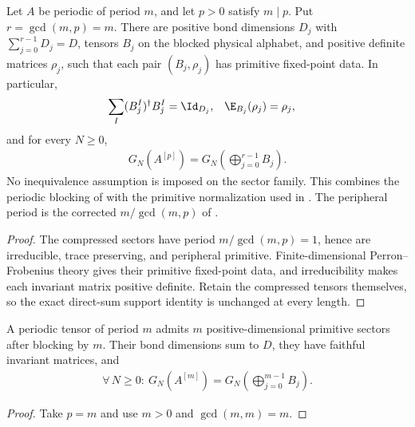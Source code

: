 \begin{lemma}
    \label{thm:periodic_primitive_ground_space}
    \leanok
    Let $A$ be periodic of period $m$, and let $p>0$ satisfy $m\mid p$.
    Put $r=\gcd(m,p)=m$. There are positive bond dimensions $D_j$ with
    $\sum_{j=0}^{r-1}D_j=D$, tensors $B_j$ on the blocked physical alphabet,
    and positive definite matrices $\rho_j$, such that each pair
    $(B_j,\rho_j)$ has primitive fixed-point data. In particular,
    \begin{align}
        \sum_I(B_j^I)^\dagger B_j^I & =\Id_{D_j},
                                    & \E_{B_j}(\rho_j) & =\rho_j,
    \end{align}
    and for every $N\geq0$,
    \begin{align}
        G_N(A^{[p]})=G_N\left(\bigoplus_{j=0}^{r-1}B_j\right).
    \end{align}
    No inequivalence assumption is imposed on the sector family.
    This combines the periodic blocking of
    \cite[Lemma~6]{DeLasCuevas2017Irreducible} with the primitive normalization
    used in \cite[Section~3, equations (3.1)--(3.2b)]{Nachtergaele1996Spectral}.
    The peripheral period is the corrected $m/\gcd(m,p)$ of
    \cite{gap:dccsp17_blocking_peripheral_roots}.
\end{lemma}
\begin{proof}\leanok
    The compressed sectors have period $m/\gcd(m,p)=1$, hence are
    irreducible, trace preserving, and peripheral primitive.
    Finite-dimensional Perron--Frobenius theory gives their primitive
    fixed-point data, and irreducibility makes each invariant matrix positive
    definite. Retain the compressed tensors themselves, so the exact
    direct-sum support identity is unchanged at every length.
\end{proof}

\begin{lemma}
    \label{thm:periodic_primitive_ground_space_at_period}
    \leanok
    A periodic tensor of period $m$ admits $m$ positive-dimensional
    primitive sectors after blocking by $m$. Their bond dimensions sum to
    $D$, they have faithful invariant matrices, and
    \begin{align}
        \forall\,N\geq0:\ G_N(A^{[m]})=G_N\left(\bigoplus_{j=0}^{m-1}B_j\right).
    \end{align}
\end{lemma}
\begin{proof}\leanok
    Take $p=m$ and use $m>0$ and $\gcd(m,m)=m$.
\end{proof}

